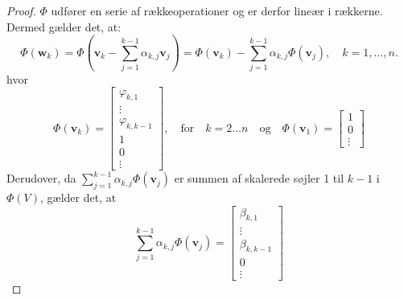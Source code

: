 \begin{proof}
    \(\Phi\) udfører en serie af rækkeoperationer og er derfor lineær i rækkerne. Dermed gælder det, at:
    \[ \Phi(\mathbf{w}_k) = \Phi(\mathbf{v}_k - \sum_{j=1}^{k-1} \alpha_{k,j} \mathbf{v}_j) = \Phi(\mathbf{v}_k) - \sum_{j=1}^{k-1} \alpha_{k,j} \Phi(\mathbf{v}_j), \quad k = 1, \ldots, n. \]
    hvor 
    \[ \Phi(\mathbf{v}_k) = 
        \begin{bmatrix}
            \varphi_{k, 1} \\
            \vdots \\
            \varphi_{k, k - 1} \\
            1 \\
            0 \\
            \vdots
        \end{bmatrix}, \quad
        \text{for} \quad k = 2 \ldots n \quad \text{og} \quad
        \Phi(\mathbf{v}_1) =
        \begin{bmatrix}
            1 \\
            0 \\
            \vdots
        \end{bmatrix}
    \]
    Derudover, da \(\sum_{j=1}^{k-1} \alpha_{k,j} \Phi(\mathbf{v}_j)\) er summen af skalerede søjler 1 til \(k-1\) i \(\Phi(V)\), gælder det, at 
    \[ \sum_{j=1}^{k-1} \alpha_{k,j} \Phi(\mathbf{v}_j) = 
        \begin{bmatrix}
            \beta_{k, 1} \\
            \vdots \\
            \beta_{k, k - 1} \\
            0 \\
            \vdots
        \end{bmatrix}
    \]


\end{proof}
